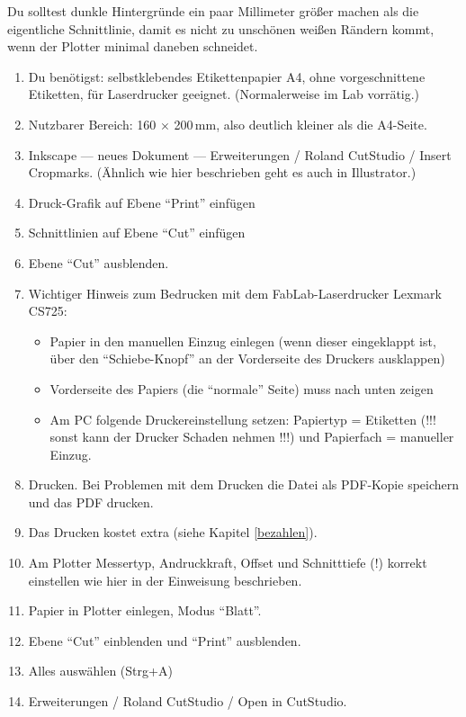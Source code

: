 \documentclass{\basedir/fablab-document}
\begin{document}
Du solltest dunkle Hintergründe ein paar Millimeter größer machen als die eigentliche Schnittlinie, damit es nicht zu unschönen weißen Rändern kommt, wenn der Plotter minimal daneben schneidet.

\begin{enumerate}
\item Du benötigst: selbstklebendes Etikettenpapier A4, ohne vorgeschnittene Etiketten, für Laserdrucker geeignet. (Normalerweise im Lab vorrätig.)
\item Nutzbarer Bereich: 160 $\times$ 200\,mm, also deutlich kleiner als die A4-Seite.
\item Inkscape --- neues Dokument --- Erweiterungen / Roland CutStudio / Insert Cropmarks. (Ähnlich wie hier beschrieben geht es auch in Illustrator.)
\item Druck-Grafik auf Ebene \enquote{Print} einfügen
\item Schnittlinien auf Ebene \enquote{Cut} einfügen
\item Ebene \enquote{Cut} ausblenden.
\item Wichtiger Hinweis zum Bedrucken mit dem FabLab-Laserdrucker Lexmark CS725:
    \begin{itemize}
    \item Papier in den manuellen Einzug einlegen (wenn dieser eingeklappt ist, über den \enquote{Schiebe-Knopf} an der Vorderseite des Druckers ausklappen)
    \item Vorderseite des Papiers (die \enquote{normale} Seite) muss nach unten zeigen
    \item Am PC folgende Druckereinstellung setzen: Papiertyp = Etiketten (!!! sonst kann der Drucker Schaden nehmen !!!) und Papierfach = manueller Einzug.
    \end{itemize}
\item Drucken. Bei Problemen mit dem Drucken die Datei als PDF-Kopie speichern und das PDF drucken.
\item Das Drucken kostet extra (siehe Kapitel \ref{bezahlen}).
\item Am Plotter Messertyp, Andruckkraft, Offset und Schnitttiefe (!) korrekt einstellen wie hier in der Einweisung beschrieben.
\item Papier in Plotter einlegen, Modus \enquote{Blatt}.
\item Ebene \enquote{Cut} einblenden und \enquote{Print} ausblenden.
\item Alles auswählen (Strg+A)
\item Erweiterungen / Roland CutStudio / Open in CutStudio.

\end{enumerate}
\end{document}
